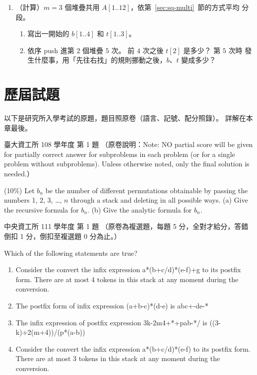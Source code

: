 \begin{enumerate}
\item （計算）$m = 3$ 個堆疊共用 $A[1..12]$，依第~\ref{sec:sq-multi}~節的方式平均
分段。
\begin{enumerate}
\item 寫出一開始的 $b[1..4]$ 和 $t[1..3]$。
\item 依序 push 進第 $2$ 個堆疊 $5$ 次。 前 $4$ 次之後 $t[2]$ 是多少？ 第 $5$ 次時
發生什麼事，用「先往右找」的規則挪動之後，$b$、$t$ 變成多少？
\end{enumerate}
\end{enumerate}

\section{歷屆試題}
\label{sec:sq-pastexam}

以下是研究所入學考試的原題，題目照原卷（語言、記號、配分照錄）。 詳解在本章最後。

\begin{pastexam}[label={px:sq-1}]{臺大資工所 108 學年度 第 1 題}
（原卷說明：Note: NO partial score will be given for partially correct answer for
subproblems in each problem (or for a single problem without subproblems). Unless
otherwise noted, only the final solution is needed.）

(10\%) Let $b_n$ be the number of different permutations obtainable by passing the
numbers 1, 2, 3, \ldots, $n$ through a stack and deleting in all possible ways. (a) Give
the recursive formula for $b_n$. (b) Give the analytic formula for $b_n$.
\end{pastexam}

\begin{pastexam}[label={px:sq-2}]{中央資工所 111 學年度 第 1 題}
（原卷為複選題，每題 5 分，全對才給分，答錯倒扣 1 分，倒扣至複選題 0 分為止。）

Which of the following statements are true?
\begin{enumerate}[label=(\Alph*)]
\item Consider the convert the infix expression a*(b+c/d)*(e-f)+g to its postfix form.
There are at most 4 tokens in this stack at any moment during the conversion.
\item The postfix form of infix expression (a+b-c)*(d-e) is abc+-de-*
\item The infix expression of postfix expression 3k-2m4+*+pab-*/ is
((3-k)+2(m+4))/(p*(a-b))
\item Consider the convert the infix expression a*(b+c/d)*(e-f) to its postfix form.
There are at most 3 tokens in this stack at any moment during the conversion.
\end{enumerate}
\end{pastexam}

